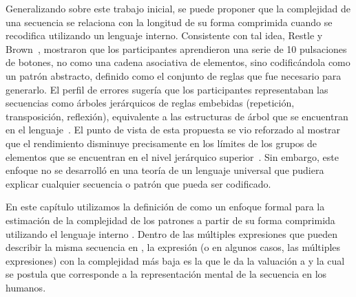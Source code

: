 
Generalizando sobre este trabajo inicial, se puede proponer que la complejidad de una secuencia se relaciona con la longitud de su forma comprimida cuando se recodifica utilizando un lenguaje interno. Consistente con tal idea, Restle y Brown~\cite{f36}, mostraron que los participantes aprendieron una serie de 10 pulsaciones de botones, no como una cadena asociativa de elementos, sino codificándola como un patrón abstracto, definido como el conjunto de reglas que fue necesario para generarlo. El perfil de errores sugería que los participantes representaban las secuencias como árboles jerárquicos de reglas embebidas (repetición, transposición, reflexión), equivalente a las estructuras de árbol que se encuentran en el lenguaje~\cite{f37}. El punto de vista de esta propuesta se vio reforzado al mostrar que el rendimiento disminuye precisamente en los límites de los grupos de elementos que se encuentran en el nivel jerárquico superior~\cite{f36,f37,f38}. Sin embargo, este enfoque no se desarrolló en una teoría de un lenguaje universal que pudiera explicar cualquier secuencia o patrón que pueda ser codificado.

En este capítulo utilizamos la definición de \mdlbin como un enfoque formal para la estimación de la complejidad de los patrones a partir de su forma comprimida utilizando el lenguaje interno \grambin. Dentro de las múltiples expresiones que pueden describir la misma secuencia en \grambin, la expresión (o en algunos casos, las múltiples expresiones) con la complejidad más baja es la que le da la valuación a \mdlbin y la cual se postula que corresponde a la representación mental de la secuencia en los humanos. 

